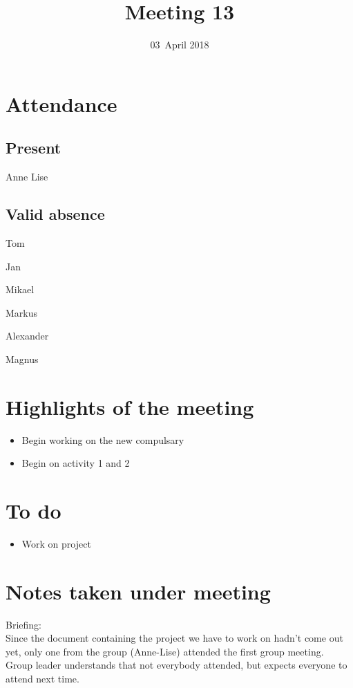 \documentclass[letterpaper,11pt]{article}
\title{Meeting 13}
\date{03~April 2018}
\begin{document}
\maketitle
\section*{Attendance}
\subsection*{Present}
\begin{list}{}{}
	\item Anne Lise
\end{list}

\subsection*{Valid absence}
\begin{list}{}{}
	\item Tom
	\item Jan
	\item Mikael
	\item Markus
	\item Alexander
	\item Magnus
\end{list}

\newpage
\section*{Highlights of the meeting}
\begin{itemize}
	\item Begin working on the new compulsary
	\item Begin on activity 1 and 2
\end{itemize}

\section*{To do}
\begin{itemize}
	\item Work on project
\end{itemize}

\section*{Notes taken under meeting}
Briefing: \\
Since the document containing the project we have to work on hadn't come out yet, only one from the group (Anne-Lise) attended the first group meeting. \\
Group leader understands that not everybody attended, but expects everyone to attend next time. \\
\end{document}
